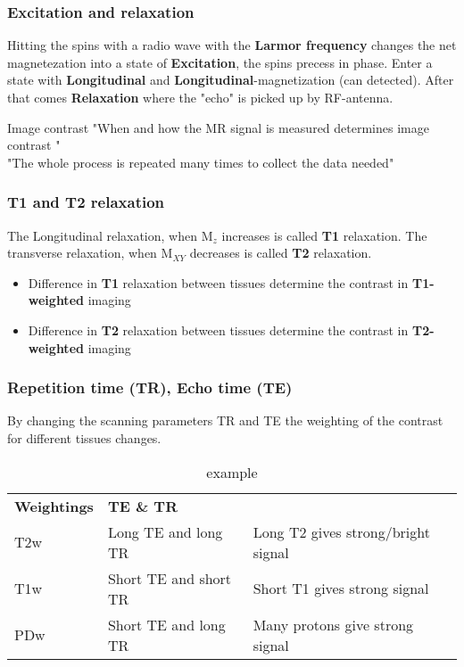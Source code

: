 		\subsubsection*{Excitation and relaxation}
		Hitting the spins with a radio wave with the \textbf{Larmor frequency} changes the net magnetezation into a state of \textbf{Excitation}, the spins precess in phase. Enter a state with \textbf{Longitudinal} and \textbf{Longitudinal}-magnetization (can detected). After that comes \textbf{Relaxation} where the "echo" is picked up by RF-antenna.

			\begin{wbox}{Image contrast}
				"When and how the MR signal is measured determines image contrast " \\
				"The whole process is repeated many times to collect the data needed"	
			\end{wbox}

		\subsubsection*{T1 and T2 relaxation}
		The Longitudinal relaxation, when M$_z$ increases is called \textbf{T1} relaxation. The transverse relaxation, when M$_{XY}$ decreases is called \textbf{T2} relaxation. 

			\begin{itemize}
				\item Difference in \textbf{T1} relaxation between tissues determine the contrast in \textbf{T1-weighted} imaging
				\item Difference in \textbf{T2} relaxation between tissues determine the contrast in \textbf{T2-weighted} imaging
			\end{itemize}	
		
		\subsubsection*{Repetition time (TR), Echo time (TE)}
		By changing the scanning parameters TR and TE the weighting of the contrast for different tissues changes. 

			\begin{table}[ht!]
			\centering
			\begin{tabular}{lll}\hline
			 \textbf{Weightings}&  \textbf{TE \& TR}&   \\
			 T2w& Long TE and long TR &  Long T2 gives strong/bright signal\\
			 T1w&  Short TE and short TR & Short T1 gives strong signal \\
			 PDw&  Short TE and long TR  & Many protons give strong signal\\ \hline
			\end{tabular}
			\caption{example}
			\label{tab:tab1}
			\end{table}

